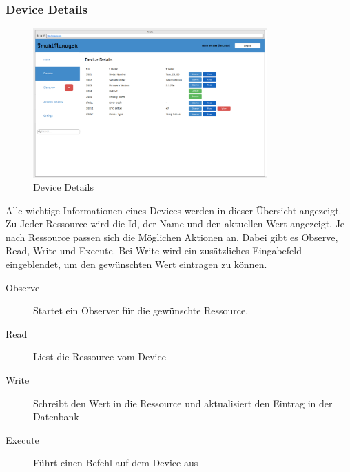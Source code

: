 \subsubsection{Device Details}
\begin{figure} [H]
	\begin{center}
	\includegraphics[width=0.80\textwidth]{../03_Design/images/devicedetails.png}
	\caption{Device Details}
	\end{center}
\end{figure}
Alle wichtige Informationen eines Devices werden in dieser Übersicht angezeigt. Zu Jeder Ressource wird die Id, der Name und den aktuellen Wert angezeigt. Je nach Ressource passen sich die Möglichen Aktionen an. Dabei gibt es Observe, Read, Write und Execute. Bei Write wird ein zusätzliches Eingabefeld eingeblendet, um den gewünschten Wert eintragen zu können.

\begin{description}
\item [Observe] Startet ein Observer für die gewünschte Ressource.
\item [Read] Liest die Ressource vom Device
\item [Write] Schreibt den Wert in die Ressource und aktualisiert den Eintrag in der Datenbank
\item [Execute] Führt einen Befehl auf dem Device aus
\end{description}

